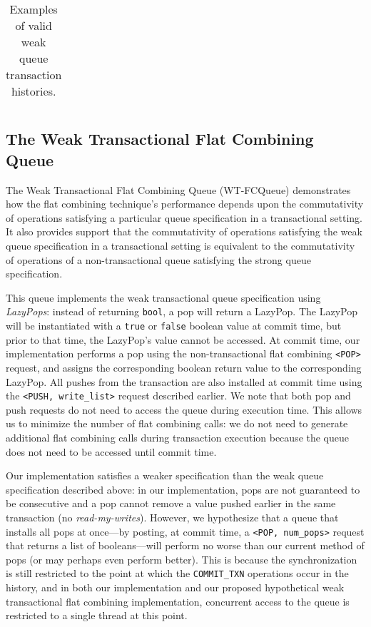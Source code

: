 \begin{table}[H]
\begin{tabular}{|l|l|}
    \end{tabular}
    \caption[Examples of valid weak queue transaction histories.]{Examples of valid weak queue transaction histories.}
    \label{tab:txnal_weakq_commute}
    \end{table}

\subsection{The Weak Transactional Flat Combining Queue}
The Weak Transactional Flat Combining Queue (WT-FCQueue) demonstrates how the flat combining technique's performance depends upon the commutativity of operations satisfying a particular queue specification in a transactional setting. It also provides support that the commutativity of operations satisfying the weak queue specification in a transactional setting is equivalent to the commutativity of operations of a non-transactional queue satisfying the strong queue specification.

This queue implements the weak transactional queue specification using \emph{LazyPops}: instead of returning \texttt{bool}, a pop will return a LazyPop. The LazyPop will be instantiated with a \texttt{true} or \texttt{false} boolean value at commit time, but prior to that time, the LazyPop's value cannot be accessed.
At commit time, our implementation performs a pop using the non-transactional flat combining \texttt{<POP>} request, and assigns the corresponding boolean return value to the corresponding LazyPop. All pushes from the transaction are also installed at commit time using the \texttt{<PUSH, write\_list>} request described earlier. We note that both pop and push requests do not need to access the queue during execution time. This allows us to minimize the number of flat combining calls: we do not need to generate additional flat combining calls during transaction execution because the queue does not need to be accessed until commit time.

Our implementation satisfies a weaker specification than the weak queue specification described above: in our implementation, pops are not guaranteed to be consecutive and a pop cannot remove a value pushed earlier in the same transaction (no \emph{read-my-writes}). However, we hypothesize that a queue that installs all pops at once---by posting, at commit time, a \texttt{<POP, num\_pops>} request that returns a list of booleans---will perform no worse than our current method of pops (or may perhaps even perform better). This is because the synchronization is still restricted to the point at which the \texttt{COMMIT\_TXN} operations occur in the history, and in both our implementation and our proposed hypothetical weak transactional flat combining implementation, concurrent access to the queue is restricted to a single thread at this point.

